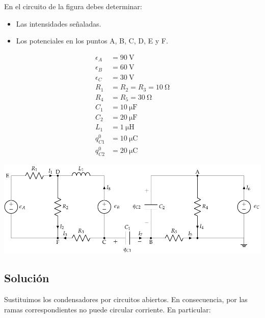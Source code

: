 \documentclass[10pt]{article}
\begin{document}
\clearpage

\section{}

En el circuito de la figura debes determinar:
\begin{itemize}
\item Las intensidades señaladas.
\item Los potenciales en los puntos A, B, C, D, E y F.
\end{itemize}


\begin{minipage}[c]{0.2\linewidth}
  \begin{align*}
    \epsilon_{A}&=\SI{90}{\volt}\\
    \epsilon_{B}&=\SI{60}{\volt}\\
    \epsilon_{C}&=\SI{30}{\volt}\\
    R_{1}&= R_2 = R_3 = \SI{10}{\ohm}\\
    R_{4}&= R_5 = \SI{30}{\ohm}\\
    C_{1}&= \SI{10}{\micro\farad}\\
    C_{2}&= \SI{20}{\micro\farad}\\
    L_1 &= \SI{1}{\micro\henry}\\
    q^0_{C1} &= \SI{10}{\micro\coulomb}\\
    q^0_{C2} &= \SI{20}{\micro\coulomb}
  \end{align*}
\end{minipage}
\begin{minipage}[c]{0.8\linewidth}
  \includegraphics[scale = 0.8]{figs/mallas_carga_inicial.pdf}
\end{minipage}

\subsection*{Solución}

Sustituimos los condensadores por circuitos abiertos. En consecuencia, por las ramas correspondientes no puede circular corriente. En particular:
\end{document}
